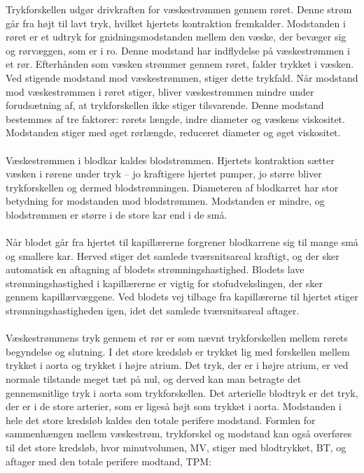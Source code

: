 Trykforskellen udgør drivkraften for væskestrømmen gennem røret. Denne strøm går fra højt til lavt tryk, hvilket hjertets kontraktion fremkalder. Modstanden i røret er et udtryk for gnidningsmodstanden mellem den væske, der bevæger sig og rørvæggen, som er i ro. Denne modstand har indflydelse på væskestrømmen i et rør. Efterhånden som væsken strømmer gennem røret, falder trykket i væsken. Ved stigende modstand mod væskestrømmen, stiger dette trykfald. Når modstand mod væskestrømmen i røret stiger, bliver væskestrømmen mindre under forudsætning af, at trykforskellen ikke stiger tilsvarende. Denne modstand bestemmes af tre faktorer: rørets længde, indre diameter og væskens viskositet. 
Modstanden stiger med øget rørlængde, reduceret diameter og øget viskositet. 
\\ \\
Væskestrømmen i blodkar kaldes blodstrømmen. Hjertets kontraktion sætter væsken i rørene under tryk – jo kraftigere hjertet pumper, jo større bliver trykforskellen og dermed blodstrømningen. Diameteren af blodkarret har stor betydning for modstanden mod blodstrømmen. Modstanden er mindre, og blodstrømmen er større i de store kar end i de små.
\\\\
Når blodet går fra hjertet til kapillærerne forgrener blodkarrene sig til mange små og smallere kar. Herved stiger det samlede tværsnitsareal kraftigt, og der sker automatisk en aftagning af blodets strømningshastighed. Blodets lave strømningshastighed i kapillærerne er vigtig for stofudvekslingen, der sker gennem kapillærvæggene. Ved blodets vej tilbage fra kapillærerne til hjertet stiger strømningshastigheden igen, idet det samlede tværsnitsareal aftager.
\\\\
Væskestrømmens tryk gennem et rør er som nævnt trykforskellen mellem rørets begyndelse og slutning. I det store kredsløb er trykket lig med forskellen mellem trykket i aorta og trykket i højre atrium. Det tryk, der er i højre atrium, er ved normale tilstande meget tæt på nul, og derved kan man betragte det gennemsnitlige tryk i aorta som trykforskellen. Det arterielle blodtryk er det tryk, der er i de store arterier, som er ligeså højt som trykket i aorta. Modstanden i hele det store kredsløb kaldes den totale perifere modstand. Formlen for sammenhængen mellem væskestrøm, trykforskel og modstand kan også overføres til det store kredsløb, hvor minutvolumen, MV, stiger med blodtrykket, BT, og aftager med den totale perifere modtand, TPM:

